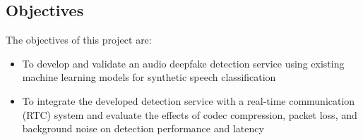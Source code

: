 \subsection{Objectives}

The objectives of this project are:
\begin{itemize}
    \item To develop and validate an audio deepfake detection service using existing machine learning models for synthetic speech classification
    \item To integrate the developed detection service with a real-time communication (RTC) system and evaluate the effects of codec compression, packet loss, and background noise on detection performance and latency
\end{itemize}